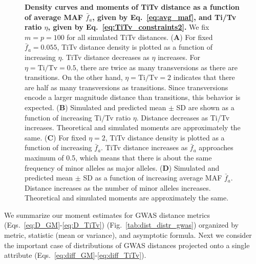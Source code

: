 \documentclass[10pt,letterpaper]{article}
\begin{document}
\begin{figure}[H]
	\centering
	\caption{{\bf Density curves and moments of TiTv distance as a function of average MAF $\bar{f}_a$, given by Eq.~\ref{eq:avg_maf}, and Ti/Tv ratio $\eta$, given by Eq.~\ref{eq:TiTv_constraints2}.} We fix $m=p=100$ for all simulated TiTv distances. (\textbf{A}) For fixed $\bar{f}_a=0.055$, TiTv distance density is plotted as a function of increasing $\eta$. TiTv distance decreases as $\eta$ increases. For $\eta=\text{Ti/Tv}=0.5$, there are twice as many transversions as there are transitions. On the other hand, $\eta=\text{Ti/Tv}=2$ indicates that there are half as many transversions as transitions. Since transversions encode a larger magnitude distance than transitions, this behavior is expected. (\textbf{B}) Simulated and predicted mean $\pm$ SD are shown as a function of increasing Ti/Tv ratio $\eta$. Distance decreases as Ti/Tv increases. Theoretical and simulated moments are approximately the same. (\textbf{C}) For fixed $\eta=2$, TiTv distance density is plotted as a function of increasing $\bar{f}_a$. TiTv distance increases as $\bar{f}_a$ approaches maximum of 0.5, which means that there is about the same frequency of minor alleles as major alleles. (\textbf{D}) Simulated and predicted mean $\pm$ SD as a function of increasing average MAF $\bar{f}_a$. Distance increases as the number of minor alleles increases. Theoretical and simulated moments are approximately the same.}\label{fig:TiTv_ridge}
\end{figure}

We summarize our moment estimates for GWAS distance metrics (Eqs.~\ref{eq:D_GM}-\ref{eq:D_TiTv}) (Fig.~\ref{tab:dist_distr_gwas}) organized by metric, statistic (mean or variance), and asymptotic formula. Next we consider the important case of distributions of GWAS distances projected onto a single attribute (Eqs.~\ref{eq:diff_GM}-\ref{eq:diff_TiTv}).
\end{document}
